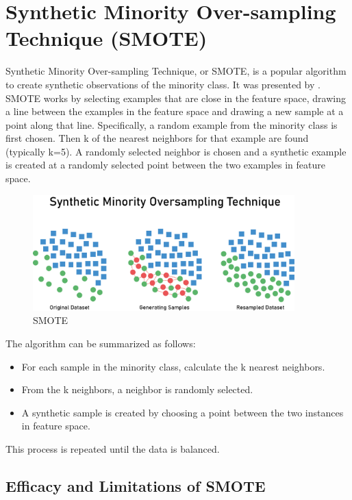 \documentclass[12pt]{report}
\begin{document}
\section*{Synthetic Minority Over-sampling Technique (SMOTE)}

Synthetic Minority Over-sampling Technique, or SMOTE, is a popular algorithm to
create synthetic observations of the minority class. It was presented by
\cite{chawla2002smote}.\\

\newpage
SMOTE works by selecting examples that are close in the feature space, drawing a line between the examples in the feature space and drawing a new sample at a point along that line. Specifically, a random example from the minority class is first chosen. Then k of the nearest neighbors for that example are found (typically k=5). A randomly selected neighbor is chosen and a synthetic example is created at a randomly selected point between the two examples in feature space.

\begin{figure}[hbt!]
    \centering
    \includegraphics[width=0.9\textwidth]{./figures/smote.png}
    \caption{SMOTE}
    \label{fig:SMOTE}
\end{figure}

The algorithm can be summarized as follows:
\begin{itemize}
    \item For each sample in the minority class, calculate the k nearest neighbors.
    \item From the k neighbors, a neighbor is randomly selected.
    \item A synthetic sample is created by choosing a point between the two instances in
          feature space.
\end{itemize}

This process is repeated until the data is balanced.

\subsection*{Efficacy and Limitations of SMOTE}
\end{document}
